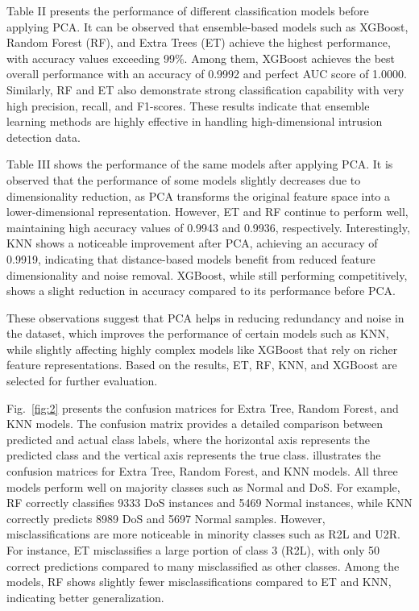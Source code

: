 \documentclass[conference]{IEEEtran}
\begin{document}
Table II presents the performance of different classification models before applying PCA. It can be observed that ensemble-based models such as XGBoost, Random Forest (RF), and Extra Trees (ET) achieve the highest performance, with accuracy values exceeding 99\%. Among them, XGBoost achieves the best overall performance with an accuracy of 0.9992 and perfect AUC score of 1.0000. Similarly, RF and ET also demonstrate strong classification capability with very high precision, recall, and F1-scores. These results indicate that ensemble learning methods are highly effective in handling high-dimensional intrusion detection data.

Table III shows the performance of the same models after applying PCA. It is observed that the performance of some models slightly decreases due to dimensionality reduction, as PCA transforms the original feature space into a lower-dimensional representation. However, ET and RF continue to perform well, maintaining high accuracy values of 0.9943 and 0.9936, respectively. Interestingly, KNN shows a noticeable improvement after PCA, achieving an accuracy of 0.9919, indicating that distance-based models benefit from reduced feature dimensionality and noise removal. XGBoost, while still performing competitively, shows a slight reduction in accuracy compared to its performance before PCA.

These observations suggest that PCA helps in reducing redundancy and noise in the dataset, which improves the performance of certain models such as KNN, while slightly affecting highly complex models like XGBoost that rely on richer feature representations. Based on the results, ET, RF, KNN, and XGBoost are selected for further evaluation.

Fig.~\ref{fig:2} presents the confusion matrices for Extra Tree, Random Forest, and KNN models. The confusion matrix provides a detailed comparison between predicted and actual class labels, where the horizontal axis represents the predicted class and the vertical axis represents the true class. illustrates the confusion matrices for Extra Tree, Random Forest, and KNN models. All three models perform well on majority classes such as Normal and DoS. For example, RF correctly classifies 9333 DoS instances and 5469 Normal instances, while KNN correctly predicts 8989 DoS and 5697 Normal samples. However, misclassifications are more noticeable in minority classes such as R2L and U2R. For instance, ET misclassifies a large portion of class 3 (R2L), with only 50 correct predictions compared to many misclassified as other classes. Among the models, RF shows slightly fewer misclassifications compared to ET and KNN, indicating better generalization.
\end{document}
